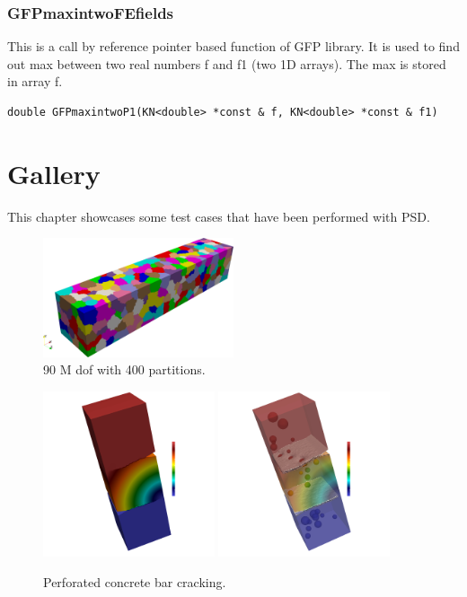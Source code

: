 \documentclass{report}
\begin{document}
\subsection{GFPmaxintwoFEfields}
This is a call by reference pointer based function of GFP library. It is used to find out max between two real numbers {\ttfamily f} and {\ttfamily f1} (two 1D arrays). The max is stored in array {\ttfamily f}.
\begin{lstlisting}[language=PSD]
double GFPmaxintwoP1(KN<double> *const & f, KN<double> *const & f1)
\end{lstlisting}

\chapter{Gallery}

This chapter showcases some test cases that have been performed with PSD.

\begin{figure}
    \centering
    \includegraphics[width=0.5\textwidth]{./Images/400partmesh3d.png}
    \caption{90 M dof with 400 partitions.}
    \label{fig:90Mdof}
\end{figure}

\begin{figure}
    \centering
    \includegraphics[width=0.45\textwidth]{./Images/rainbow-test.png}    \includegraphics[width=0.45\textwidth]{./Images/rainbow-test1.png}
    \caption{Perforated concrete bar cracking.}
    \label{fig:rainbow}
\end{figure}
\end{document}
